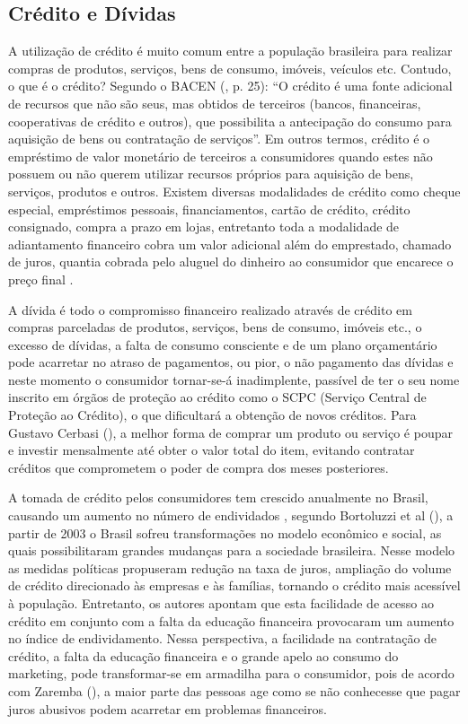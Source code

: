 \subsection{Crédito e Dívidas}
A utilização de crédito é muito comum entre a população brasileira para realizar compras de produtos, serviços, bens de consumo, imóveis, veículos etc. Contudo, o que é o crédito? Segundo o BACEN (\citeyear{bacen2013}, p. 25): “O crédito é uma fonte adicional de recursos que não são seus, mas obtidos de terceiros (bancos, financeiras, cooperativas de crédito e outros), que possibilita a antecipação do consumo para aquisição de bens ou contratação de serviços”. Em outros termos, crédito é o empréstimo de valor monetário de terceiros a consumidores quando estes não possuem ou não querem utilizar recursos próprios para aquisição de bens, serviços, produtos e outros. Existem diversas modalidades de crédito como cheque especial, empréstimos pessoais, financiamentos, cartão de crédito, crédito consignado, compra a prazo em lojas, entretanto toda a modalidade de adiantamento financeiro cobra um valor adicional além do emprestado, chamado de juros, quantia cobrada pelo aluguel do dinheiro ao consumidor que encarece o preço final \cite{bacen2013}.

A dívida é todo o compromisso financeiro realizado através de crédito em compras parceladas de produtos, serviços, bens de consumo, imóveis etc., o excesso de dívidas, a falta de consumo consciente e de um plano orçamentário pode acarretar no atraso de pagamentos, ou pior, o não pagamento das dívidas e neste momento o consumidor tornar-se-á inadimplente, passível de ter o seu nome inscrito em órgãos de proteção ao crédito como o SCPC (Serviço Central de Proteção ao Crédito), o que dificultará a obtenção de novos créditos. Para Gustavo Cerbasi (\citeyear{cerbasi2015}), a melhor forma de comprar um produto ou serviço é poupar e investir mensalmente até obter o valor total do item, evitando contratar créditos que comprometem o poder de compra dos meses posteriores.

A tomada de crédito pelos consumidores tem crescido anualmente no Brasil, causando um aumento no número de endividados \cite{cnc2020}, segundo Bortoluzzi et al (\citeyear{bortoluzzi2015}), a partir de 2003 o Brasil sofreu transformações no modelo econômico e social, as quais possibilitaram grandes mudanças para a sociedade brasileira. Nesse modelo as medidas políticas propuseram redução na taxa de juros, ampliação do volume de crédito direcionado às empresas e às famílias, tornando o crédito mais acessível à população. Entretanto, os autores apontam que esta facilidade de acesso ao crédito em conjunto com a falta da educação financeira provocaram um aumento no índice de endividamento. Nessa perspectiva, a facilidade na contratação de crédito, a falta da educação financeira e o grande apelo ao consumo do marketing, pode transformar-se em armadilha para o consumidor, pois de acordo com Zaremba (\citeyear{zaremba2007}), a maior parte das pessoas age como se não conhecesse que pagar juros abusivos podem acarretar em problemas financeiros.

